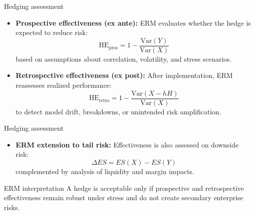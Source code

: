\documentclass[aspectratio=169, 10pt]{beamer} %
\begin{document}
\begin{frame}{Hedging assessment}
\begin{itemize}

  \item[$\bullet$] \textbf{Prospective effectiveness (ex ante):}
  ERM evaluates whether the hedge is expected to reduce risk:
  \[
  \text{HE}_{\text{pros}} = 1 - 
  \frac{\mathrm{Var}(Y)}{\mathrm{Var}(X)}
  \]
  based on assumptions about correlation, volatility, and stress scenarios.

  \item[$\bullet$] \textbf{Retrospective effectiveness (ex post):}
  After implementation, ERM reassesses realized performance:
  \[
  \text{HE}_{\text{retro}} = 1 -
  \frac{\mathrm{Var}(X - hH)}{\mathrm{Var}(X)}
  \]
  to detect model drift, breakdowns, or unintended risk amplification.

  \end{itemize}

  \end{frame}

\begin{frame}{Hedging assessment}
\begin{itemize}

  \item[$\bullet$] \textbf{ERM extension to tail risk:}
  Effectiveness is also assessed on downside risk:
  \[
  \Delta ES = ES(X) - ES(Y)
  \]
  complemented by analysis of liquidity and margin impacts.
\end{itemize}

\begin{block}{ERM interpretation}
A hedge is acceptable only if prospective and retrospective effectiveness
remain robust under stress and do not create secondary enterprise risks.
\end{block}

\medskip 
\medskip 

 \href{https://github.com/fsananou/bsb-erm/blob/main/_exercice_and_cases.pdf}{}

\end{frame}
\end{document}
